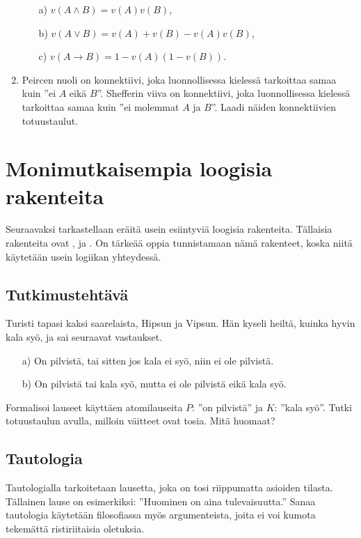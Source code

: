 \begin{enumerate}
\begin{itemize}
\item[a)] $v(A\land B)=v(A)v(B)$,
\item[b)] $v(A\lor B)=v(A)+v(B)- v(A)v(B)$,
\item[c)] $v(A\to B)=1-v(A)(1-v(B))$.
\end{itemize}

\item
Peircen nuoli on konnektiivi, joka luonnollisessa kielessä tarkoittaa samaa kuin ''ei $A$ eikä $B$''. Shefferin viiva on konnektiivi, joka luonnollisessa kielessä tarkoittaa samaa kuin ''ei molemmat $A$ ja $B$''. Laadi näiden konnektiivien totuustaulut. 
\end{enumerate}

\newpage

\section{Monimutkaisempia loogisia rakenteita}
\label{monimloog}
Seuraavaksi tarkastellaan eräitä usein esiintyviä loogisia rakenteita. Tällaisia rakenteita ovat ,  ja . On tärkeää oppia tunnistamaan nämä rakenteet, koska niitä käytetään usein logiikan yhteydessä.

\subsection*{Tutkimustehtävä}
Turisti tapasi kaksi saarelaista, Hipsun ja Vipsun. Hän kyseli heiltä, kuinka hyvin kala syö, ja sai seuraavat vastaukset.
\begin{enumerate}
\item[a)] On pilvistä, tai sitten jos kala ei syö, niin ei ole pilvistä.
\item[b)] On pilvistä tai kala syö, mutta ei ole pilvistä eikä kala syö.
\end{enumerate}
Formalisoi lauseet käyttäen atomilauseita $P$: ''on pilvistä'' ja $K$: ''kala syö''. Tutki totuustaulun avulla, milloin väitteet ovat tosia. Mitä huomaat?

\subsection*{Tautologia}
Tautologialla tarkoitetaan lausetta, joka on tosi riippumatta asioiden tilasta. Tällainen lause on esimerkiksi: ''Huominen on aina tulevaisuutta.'' Sanaa tautologia käytetään filosofiassa myös argumenteista, joita ei voi kumota tekemättä ristiriitaisia oletuksia.

